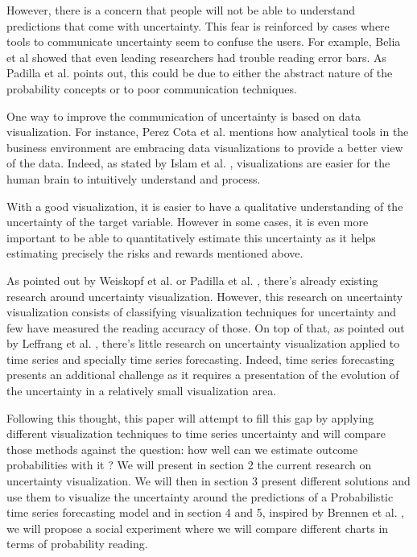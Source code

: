 \documentclass[a4paper,3p,sort&compress]{elsarticle}
\begin{document}
However, there is a concern that people will not be able to understand predictions that come with uncertainty.
This fear is reinforced by cases where tools to communicate uncertainty seem to confuse the users. For example,
Belia et al \cite{belia_researchers_2005} showed that even leading researchers had 
trouble reading error bars. 
As Padilla et al. \cite{padilla_uncertainty_2021} 
points out, this could be due to either the abstract nature of the probability concepts or to poor communication techniques.

One way to improve the communication of uncertainty is based on data visualization. For instance, Perez Cota et al. 
\cite{cota_importance_2014} mentions how analytical tools in the business 
environment are embracing data visualizations to provide a better view of the data. Indeed, as 
stated by Islam et al. \cite{islam_overview_2019}, visualizations are easier for the human brain to intuitively understand and process.

With a good visualization, it is easier to have a qualitative understanding of the uncertainty of the target variable. 
However in some cases, it is even more important to be able to quantitatively estimate this uncertainty as it helps estimating precisely 
the risks and rewards mentioned above. 

As pointed out by Weiskopf et al. \cite{weiskopf_uncertainty_2022} or Padilla et al. \cite{padilla_uncertainty_2021}, 
there's already existing research around uncertainty visualization. However, this research on uncertainty visualization consists of 
classifying visualization techniques for uncertainty and few have measured the reading accuracy of those.
On top of that, as pointed out by Leffrang et al. \cite{leffrang_should_2021}, 
there's little research on uncertainty visualization applied to time series 
and specially time series forecasting. Indeed, time series forecasting presents an additional challenge as it requires a presentation of 
the evolution of the uncertainty in a relatively small visualization area.

Following this thought, this paper will attempt to fill this gap by applying different visualization techniques 
to time series uncertainty and will compare those methods against the question: how well can we estimate outcome probabilities with it ? 
We will present in section 2 the current research on uncertainty 
visualization. We will then in section 3
present different solutions and use them to visualize the uncertainty around the predictions 
of a Probabilistic time series forecasting model and in section 4 and 5,
inspired by Brennen et al. \cite{brennen_instrument_2018}, we will propose a 
social experiment where we will compare different charts in terms of probability reading. 
\end{document}
